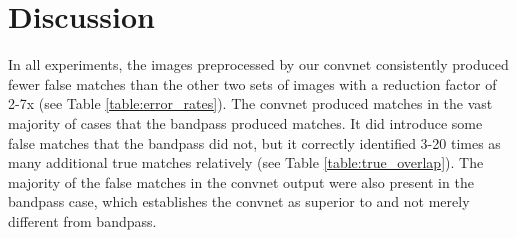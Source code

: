 \documentclass{article}
\begin{document}

\section{Discussion}


In all experiments, the images preprocessed by our convnet consistently produced fewer false matches than the other two sets of images with a reduction factor of 2-7x (see Table \ref{table:error_rates}). The convnet produced matches in the vast majority of cases that the bandpass produced matches. It did introduce some false matches that the bandpass did not, but it correctly identified 3-20 times as many additional true matches relatively (see Table \ref{table:true_overlap}). The majority of the false matches in the convnet output were also present in the bandpass case, which establishes the convnet as superior to and not merely different from bandpass.
\end{document}
